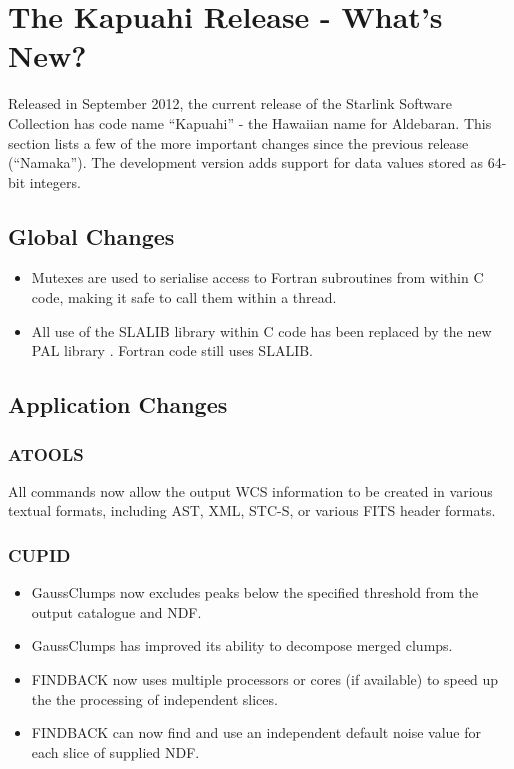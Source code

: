 \section{The Kapuahi Release - What's New?}
Released in September 2012, the current release of the Starlink Software
Collection has code name ``Kapuahi'' - the Hawaiian name for Aldebaran.
This section lists a few of the more important changes since the previous
release (``Namaka''). The development version adds support for data values
stored as 64-bit integers.

\subsection{Global Changes}
\begin{itemize}
\item Mutexes are used to serialise access to Fortran subroutines from within
C code, making it safe to call them within a thread.
\item All use of the SLALIB library within C code has been replaced by the new
PAL library \citep{P56_adassxxii}. Fortran code still uses SLALIB.
\end{itemize}

\subsection{Application Changes}

\subsubsection{ATOOLS}
All commands now allow the output WCS information to be created
in various textual formats, including AST, XML, STC-S, or
various FITS header formats.

\subsubsection{CUPID}
\begin{itemize}
\item GaussClumps now excludes peaks below the specified threshold from the output catalogue and NDF.
\item GaussClumps has improved its ability to decompose merged clumps.
\item FINDBACK now uses multiple processors or cores (if available) to speed up the the processing of independent slices.
\item FINDBACK can now find and use an independent default noise value for each slice of supplied NDF.
\end{itemize}

